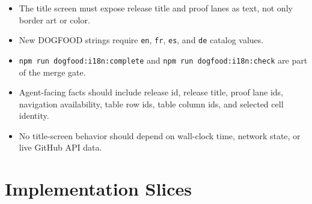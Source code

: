 \begin{itemize}
\tightlist
\item
  The title screen must expose release title and proof lanes as text, not only border art or color.
\item
  New DOGFOOD strings require \texttt{e\allowbreak{}n}, \texttt{f\allowbreak{}r}, \texttt{e\allowbreak{}s}, and \texttt{d\allowbreak{}e} catalog values.
\item
  \texttt{n\allowbreak{}p\allowbreak{}m\allowbreak{} \allowbreak{}r\allowbreak{}u\allowbreak{}n\allowbreak{} \allowbreak{}d\allowbreak{}o\allowbreak{}g\allowbreak{}f\allowbreak{}o\allowbreak{}o\allowbreak{}d\allowbreak{}:\allowbreak{}i\allowbreak{}1\allowbreak{}8\allowbreak{}n\allowbreak{}:\allowbreak{}c\allowbreak{}o\allowbreak{}m\allowbreak{}p\allowbreak{}l\allowbreak{}e\allowbreak{}t\allowbreak{}e} and \texttt{n\allowbreak{}p\allowbreak{}m\allowbreak{} \allowbreak{}r\allowbreak{}u\allowbreak{}n\allowbreak{} \allowbreak{}d\allowbreak{}o\allowbreak{}g\allowbreak{}f\allowbreak{}o\allowbreak{}o\allowbreak{}d\allowbreak{}:\allowbreak{}i\allowbreak{}1\allowbreak{}8\allowbreak{}n\allowbreak{}:\allowbreak{}c\allowbreak{}h\allowbreak{}e\allowbreak{}c\allowbreak{}k} are part of the merge gate.
\item
  Agent-facing facts should include release id, release title, proof lane ids, navigation availability, table row ids, table column ids, and selected cell identity.
\item
  No title-screen behavior should depend on wall-clock time, network state, or live GitHub API data.
\end{itemize}

\section{Implementation Slices}\label{record-101-implementation-slices}

